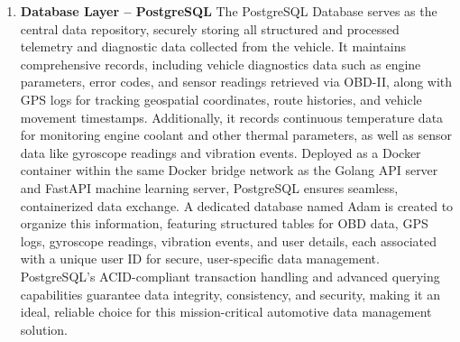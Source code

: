 \begin{enumerate}
        The Golang Server acts as the intermediate communication layer between the Raspberry Pi 5 edge device and the backend infrastructure, enabling structured, secure, and reliable data exchange. It exposes three RESTful endpoints: /upload, /data, and /health, each designed to handle specific interactions. The /upload endpoint, accessible via a POST request, receives CSV files containing logged telemetry data from the Raspberry Pi. Upon receiving a file, it processes the content using Go’s CSV reader package, reads the records line by line, and dynamically constructs SQL queries to insert the data into a PostgreSQL database, ensuring flexibility in handling varying data formats. The /data endpoint, accessible via a GET request, executes predefined SQL queries on the database to fetch the latest stored records and returns the results as a structured HTTP response to the requester. Additionally, a lightweight /health endpoint, using a GET method, provides a quick health check mechanism for monitoring the server’s operational status. This Golang-based API server forms a robust and efficient bridge between the vehicle's edge-level data collection systems and centralized backend services, ensuring reliable data ingestion, storage, and retrieval in real-time or batch scenarios.
    \item \textbf{Database Layer – PostgreSQL}
        The PostgreSQL Database serves as the central data repository, securely storing all structured and processed telemetry and diagnostic data collected from the vehicle. It maintains comprehensive records, including vehicle diagnostics data such as engine parameters, error codes, and sensor readings retrieved via OBD-II, along with GPS logs for tracking geospatial coordinates, route histories, and vehicle movement timestamps. Additionally, it records continuous temperature data for monitoring engine coolant and other thermal parameters, as well as sensor data like gyroscope readings and vibration events. Deployed as a Docker container within the same Docker bridge network as the Golang API server and FastAPI machine learning server, PostgreSQL ensures seamless, containerized data exchange. A dedicated database named Adam is created to organize this information, featuring structured tables for OBD data, GPS logs, gyroscope readings, vibration events, and user details, each associated with a unique user ID for secure, user-specific data management. PostgreSQL’s ACID-compliant transaction handling and advanced querying capabilities guarantee data integrity, consistency, and security, making it an ideal, reliable choice for this mission-critical automotive data management solution.

\end{enumerate}
